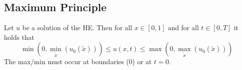 \subsection{Maximum Principle}
    Let $u$ be a solution of the HE. Then for all $x \in [0,1]$ and for all $ t \in [0,T]$ it holds that
    $$
        \min\left(0, \min_{\tilde{x}}(u_0(\tilde{x}))\right) \leq u(x,t) \leq \max\left(0, \max_{\tilde{x}}(u_0(\tilde{x}))\right)
    $$
    The max/min must occur at boundaries (0) or at $t=0$.